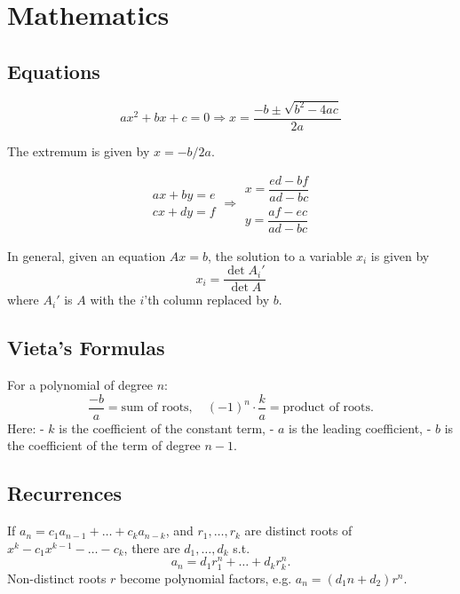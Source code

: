
\chapter{Mathematics}

\section{Equations}
\[ax^2+bx+c=0 \Rightarrow x = \frac{-b\pm\sqrt{b^2-4ac}}{2a}\]

The extremum is given by $x = -b/2a$.

\[\begin{aligned}ax+by=e\\cx+dy=f\end{aligned}
\Rightarrow
\begin{aligned}x=\dfrac{ed-bf}{ad-bc}\\y=\dfrac{af-ec}{ad-bc}\end{aligned}\]

In general, given an equation $Ax = b$, the solution to a variable $x_i$ is given by
\[x_i = \frac{\det A_i'}{\det A} \]
where $A_i'$ is $A$ with the $i$'th column replaced by $b$.

\section{Vieta's Formulas}  
For a polynomial of degree \( n \):  
\[
\frac{-b}{a} = \text{sum of roots}, \quad (-1)^n \cdot \frac{k}{a} = \text{product of roots}.
\]  
Here:  
- \( k \) is the coefficient of the constant term,  
- \( a \) is the leading coefficient,  
- \( b \) is the coefficient of the term of degree \( n - 1 \).

\section{Recurrences}
If $a_n = c_1 a_{n-1} + \dots + c_k a_{n-k}$, and $r_1, \dots, r_k$ are distinct roots of $x^k - c_1 x^{k-1} - \dots - c_k$, there are $d_1, \dots, d_k$ s.t.
\[a_n = d_1r_1^n + \dots + d_kr_k^n. \]
Non-distinct roots $r$ become polynomial factors, e.g. $a_n = (d_1n + d_2)r^n$.

